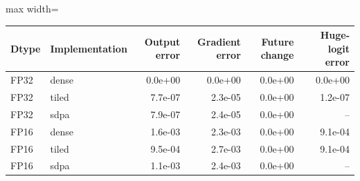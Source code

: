 \scriptsize
\setlength{\tabcolsep}{3.5pt}
\label{tab:t2aerr}
\begin{adjustbox}{max width=\linewidth}
\begin{tabular}{llrrrr}
\toprule
Dtype & Implementation & Output error & Gradient error & Future change & Huge-logit error \\
\midrule
FP32 & dense & 0.0e+00 & 0.0e+00 & 0.0e+00 & 0.0e+00 \\
FP32 & tiled & 7.7e-07 & 2.3e-05 & 0.0e+00 & 1.2e-07 \\
FP32 & sdpa & 7.9e-07 & 2.4e-05 & 0.0e+00 & -- \\
FP16 & dense & 1.6e-03 & 2.3e-03 & 0.0e+00 & 9.1e-04 \\
FP16 & tiled & 9.5e-04 & 2.7e-03 & 0.0e+00 & 9.1e-04 \\
FP16 & sdpa & 1.1e-03 & 2.4e-03 & 0.0e+00 & -- \\
\bottomrule
\end{tabular}
\end{adjustbox}
